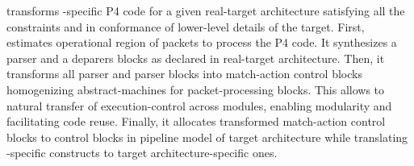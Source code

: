 \documentclass[letterpaper,twocolumn,10pt]{article}
\begin{document}
\ucomp transforms \uarch-specific P4 code for a given real-target
architecture satisfying all the constraints and in conformance of
lower-level details of the target.  First, \ucomp estimates
operational region of packets to process the P4 code.  It synthesizes
a parser and a deparers blocks as declared in real-target
architecture.  Then, it transforms all parser and parser blocks into
match-action control blocks homogenizing abstract-machines for
packet-processing blocks.  This allows to natural transfer of
execution-control across modules, enabling modularity and facilitating
code reuse.  Finally, it allocates transformed match-action control
blocks to control blocks in pipeline model of target architecture
while translating \uarch-specific constructs to target
architecture-specific ones.






\end{document}
